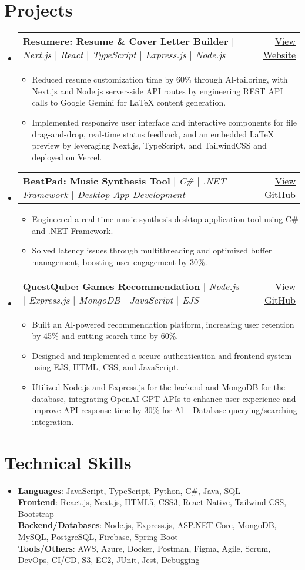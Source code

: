 \documentclass[letterpaper,11pt]{article}
\makeatletter
\newcommand{\resumeItem}[1]{
\item\small{
{#1 \vspace{-2pt}}
}
}
\newcommand{\resumeProjectHeading}[2]{
\item
\begin{tabular*}{0.97\textwidth}{l@{\extracolsep{\fill}}r}
\small#1 & #2 \\
\end{tabular*}\vspace{-7pt}
}
\newcommand{\resumeSubHeadingListStart}{\begin{itemize}[leftmargin=0.15in, label={}]}
\newcommand{\resumeSubHeadingListEnd}{\end{itemize}}
\newcommand{\resumeItemListStart}{\begin{itemize}}
\newcommand{\resumeItemListEnd}{\end{itemize}\vspace{-5pt}}
\makeatother
\begin{document}
\section{Projects}
\resumeSubHeadingListStart
\resumeProjectHeading{\textbf{Resumere: Resume \& Cover Letter Builder} $|$ \emph{Next.js $|$ React $|$ TypeScript $|$ Express.js $|$ Node.js}}{\href{https://dndanny.vercel.app}{View Website}}
\resumeItemListStart
\resumeItem{Reduced resume customization time by 60\% through Al-tailoring, with Next.js and Node.js server-side API routes by engineering REST API calls to Google Gemini for LaTeX content generation.}
\resumeItem{Implemented responsive user interface and interactive components for file drag-and-drop, real-time status feedback, and an embedded LaTeX preview by leveraging Next.js, TypeScript, and TailwindCSS and deployed on Vercel.}
\resumeItemListEnd
\resumeProjectHeading{\textbf{BeatPad: Music Synthesis Tool} $|$ \emph{C\# $|$ .NET Framework $|$ Desktop App Development}}{\href{https://github.com/dndanny}{View GitHub}}
\resumeItemListStart
\resumeItem{Engineered a real-time music synthesis desktop application tool using C\# and .NET Framework.}
\resumeItem{Solved latency issues through multithreading and optimized buffer management, boosting user engagement by 30\%.}
\resumeItemListEnd
\resumeProjectHeading{\textbf{QuestQube: Games Recommendation} $|$ \emph{Node.js $|$ Express.js $|$ MongoDB $|$ JavaScript $|$ EJS}}{\href{https://github.com/dndanny}{View GitHub}}
\resumeItemListStart
\resumeItem{Built an Al-powered recommendation platform, increasing user retention by 45\% and cutting search time by 60\%.}
\resumeItem{Designed and implemented a secure authentication and frontend system using EJS, HTML, CSS, and JavaScript.}
\resumeItem{Utilized Node.js and Express.js for the backend and MongoDB for the database, integrating OpenAI GPT APIs to enhance user experience and improve API response time by 30\% for Al – Database querying/searching integration.}
\resumeItemListEnd
\resumeSubHeadingListEnd

\section{Technical Skills} %
\begin{itemize}[leftmargin=0.15in, label={}]
\item{
\textbf{Languages}{: JavaScript, TypeScript, Python, C\#, Java, SQL} \\
\textbf{Frontend}{: React.js, Next.js, HTML5, CSS3, React Native, Tailwind CSS, Bootstrap} \\
\textbf{Backend/Databases}{: Node.js, Express.js, ASP.NET Core, MongoDB, MySQL, PostgreSQL, Firebase, Spring Boot} \\
\textbf{Tools/Others}{: AWS, Azure, Docker, Postman, Figma, Agile, Scrum, DevOps, CI/CD, S3, EC2, JUnit, Jest, Debugging}
} \\
\end{itemize}


\end{document}
